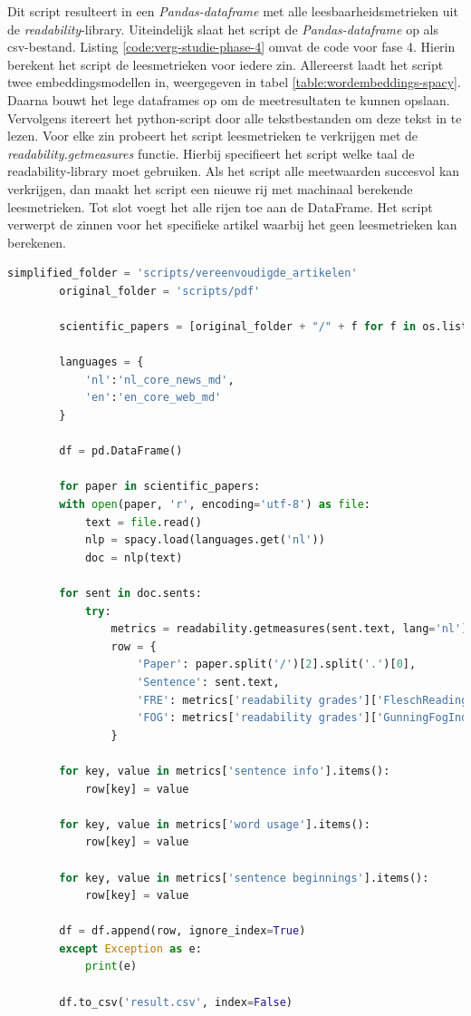 Dit script resulteert in een \textit{Pandas-dataframe} met alle leesbaarheidsmetrieken uit de \textit{readability}-library. Uiteindelijk slaat het script de \textit{Pandas-dataframe} op als csv-bestand. Listing \ref{code:verg-studie-phase-4} omvat de code voor fase 4. Hierin berekent het script de leesmetrieken voor iedere zin. Allereerst laadt het script twee embeddingsmodellen in, weergegeven in tabel \ref{table:wordembeddings-spacy}. Daarna bouwt het lege dataframes op om de meetresultaten te kunnen opslaan. Vervolgens itereert het python-script door alle tekstbestanden om deze tekst in te lezen. Voor elke zin probeert het script leesmetrieken te verkrijgen met de \textit{readability.getmeasures} functie. Hierbij specifieert het script welke taal de readability-library moet gebruiken. Als het script alle meetwaarden succesvol kan verkrijgen, dan maakt het script een nieuwe rij met machinaal berekende leesmetrieken. Tot slot voegt het alle rijen toe aan de DataFrame. Het script verwerpt de zinnen voor het specifieke artikel waarbij het geen leesmetrieken kan berekenen.

\begin{center}
	\begin{lstlisting}[language=Python, caption={Script voor de vierde fase van de vergelijkende studie}, label={code:verg-studie-phase-4}]	
		simplified_folder = 'scripts/vereenvoudigde_artikelen'
		original_folder = 'scripts/pdf'
		
		scientific_papers = [original_folder + "/" + f for f in os.listdir(original_folder)] + [simplified_folder + "/" + f for f in os.listdir(simplified_folder)]
		
		languages = {
			'nl':'nl_core_news_md',
			'en':'en_core_web_md'
		}
		
		df = pd.DataFrame()
		
		for paper in scientific_papers:
		with open(paper, 'r', encoding='utf-8') as file:
			text = file.read()
			nlp = spacy.load(languages.get('nl'))
			doc = nlp(text)
		
		for sent in doc.sents:
			try:
				metrics = readability.getmeasures(sent.text, lang='nl')
				row = {
					'Paper': paper.split('/')[2].split('.')[0],
					'Sentence': sent.text,
					'FRE': metrics['readability grades']['FleschReadingEase'],
					'FOG': metrics['readability grades']['GunningFogIndex'],
				}
		
		for key, value in metrics['sentence info'].items():
			row[key] = value
		
		for key, value in metrics['word usage'].items():
			row[key] = value
		
		for key, value in metrics['sentence beginnings'].items():
			row[key] = value
			
		df = df.append(row, ignore_index=True)
		except Exception as e:
			print(e)
		
		df.to_csv('result.csv', index=False)
	\end{lstlisting}
\end{center}

